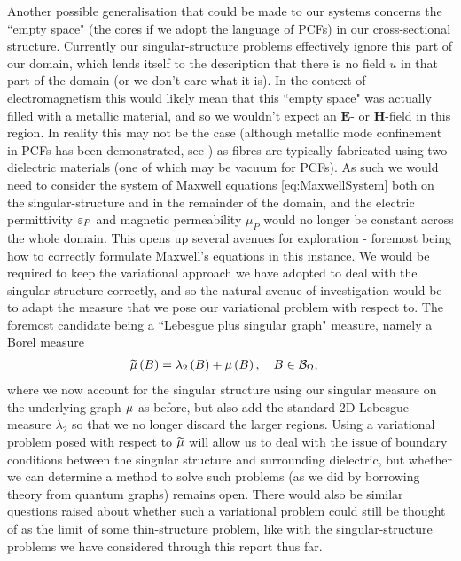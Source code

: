 Another possible generalisation that could be made to our systems concerns the ``empty space" (the cores if we adopt the language of PCFs) in our cross-sectional structure.
Currently our singular-structure problems effectively ignore this part of our domain, which lends itself to the description that there is no field $u$ in that part of the domain (or we don't care what it is).
In the context of electromagnetism this would likely mean that this ``empty space" was actually filled with a metallic material, and so we wouldn't expect an $\mathbf{E}$- or $\mathbf{H}$-field in this region.
In reality this may not be the case (although metallic mode confinement in PCFs has been demonstrated, see \cite{hou2008metallic}) as fibres are typically fabricated using two dielectric materials (one of which may be vacuum for PCFs).
As such we would need to consider the system of Maxwell equations \eqref{eq:MaxwellSystem} both on the singular-structure and in the remainder of the domain, and the electric permittivity $\varepsilon_{P}$ and magnetic permeability $\mu_{P}$ would no longer be constant across the whole domain.
This opens up several avenues for exploration - foremost being how to correctly formulate Maxwell's equations in this instance.
We would be required to keep the variational approach we have adopted to deal with the singular-structure correctly, and so the natural avenue of investigation would be to adapt the measure that we pose our variational problem with respect to.
The foremost candidate being a ``Lebesgue plus singular graph" measure, namely a Borel measure
\begin{align*}
	\widetilde{\mu}\left( B \right) &= \lambda_{2}\left( B \right) + \mu\left( B \right), \quad B\in\mathcal{B}_{\Omega},
\end{align*}
where we now account for the singular structure using our singular measure on the underlying graph $\mu$ as before, but also add the standard 2D Lebesgue measure $\lambda_2$ so that we no longer discard the larger regions.
Using a variational problem posed with respect to $\widetilde{\mu}$ will allow us to deal with the issue of boundary conditions between the singular structure and surrounding dielectric, but whether we can determine a method to solve such problems (as we did by borrowing theory from quantum graphs) remains open.
There would also be similar questions raised about whether such a variational problem could still be thought of as the limit of some thin-structure problem, like with the singular-structure problems we have considered through this report thus far.

